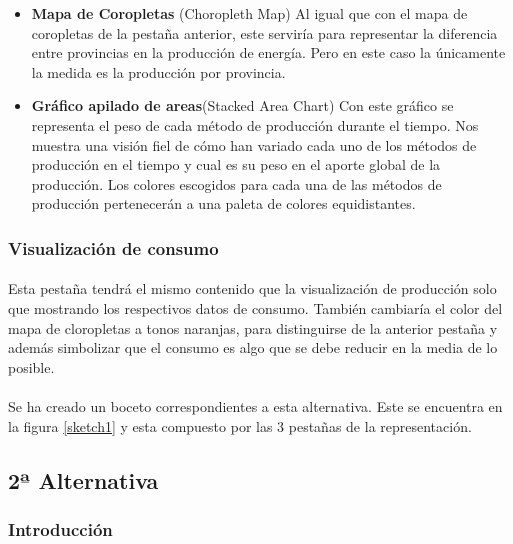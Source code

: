 \documentclass[11pt,spanish]{article}
\begin{document}
				\begin{itemize}
				
					\item  {\bf Mapa de Coropletas} (Choropleth Map) Al igual que con el mapa de coropletas de la pestaña anterior, este serviría para representar la diferencia entre provincias en la producción de energía. Pero en este caso la únicamente la medida es la producción por provincia.
	
					\item  {\bf Gráfico apilado de areas}(Stacked Area Chart) Con este gráfico se representa el peso de cada método de producción durante el tiempo. Nos muestra una visión fiel de cómo han variado cada uno de los métodos de producción en el tiempo y cual es su peso en el aporte global de la producción. Los colores escogidos para cada una de las métodos de producción pertenecerán a una paleta de colores equidistantes.
					
				\end{itemize}

			\subsubsection{Visualización de consumo}

				\paragraph{}
				Esta pestaña tendrá el mismo contenido que la visualización de producción solo que mostrando los respectivos datos de consumo. También cambiaría el color del mapa de cloropletas a tonos naranjas, para distinguirse de la anterior pestaña y además simbolizar que el consumo es algo que se debe reducir en la media de lo posible.
				
			\paragraph{}
			Se ha creado un boceto correspondientes a esta alternativa. Este se encuentra en la figura \ref{sketch1} y esta compuesto por las 3 pestañas de la representación.
				
		\subsection{2ª Alternativa}
		
			\subsubsection{Introducción}
				
\end{document}
